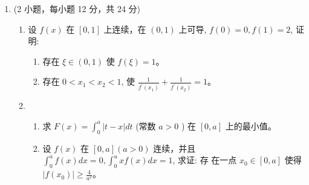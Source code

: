 \begin{enumerate}
{\begin{enumerate}
		
		
		
	\end{enumerate}
	
	
}

\newpage
\item 
(2 小题，每小题 12 分，共 24 分)
\begin{enumerate}
	\item
设 $f(x)$ 在 $[0,1]$ 上连续，在 $(0,1)$ 上可导, $f(0)=0, f(1)=2$, 证明:
\begin{enumerate}
	\item
 存在 $\xi \in(0,1)$ 使 $f(\xi)=1$。
\item 
存在 $0<x_{1}<x_{2}<1$, 使 $\frac{1}{f^{\prime}\left(x_{1}\right)}+\frac{1}{f^{\prime}\left(x_{2}\right)}=1$。
\end{enumerate}
	
	
\item 
\begin{enumerate}
	\item
	求 $F(x)=\int_{0}^{a}|t-x| d t$ (常数 $a>0$ ) 在 $[0, a]$ 上的最小值。
	\item 
	设 $f(x)$ 在 $[0, a](a>0)$ 连续，并且 $\int_{0}^{a} f(x) d x=0, \int_{0}^{u} x f(x) d x=1$, 求证: 存 在一点 $x_{0} \in[0, a]$ 使得 $\left|f\left(x_{0}\right)\right| \geqslant \frac{4}{a^{2}}$。
	
	
\end{enumerate}


	
	
	
	
\end{enumerate}



\end{enumerate}
